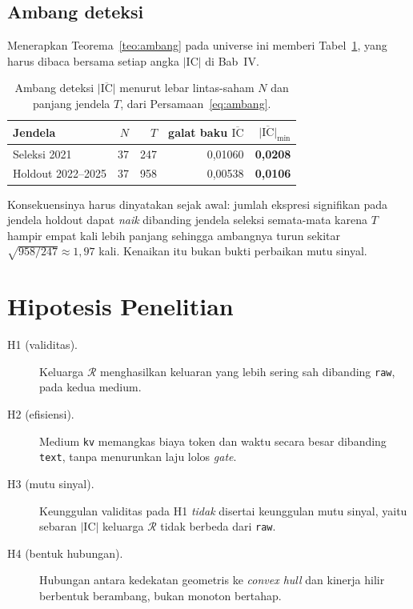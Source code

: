 \documentclass{laporanta1statugm}
\newcommand{\code}[1]{\texttt{#1}}
\begin{document}
\subsection{Ambang deteksi}

Menerapkan Teorema~\ref{teo:ambang} pada universe ini memberi
Tabel~\ref{tab:ambang}, yang harus dibaca bersama setiap angka
$\lvert\mathrm{IC}\rvert$ di Bab~IV.

\begin{table}[htbp]
\centering
\caption{Ambang deteksi $\lvert\overline{\mathrm{IC}}\rvert$ menurut lebar
lintas-saham $N$ dan panjang jendela $T$, dari Persamaan~\eqref{eq:ambang}.}
\label{tab:ambang}
\small
\begin{tabular}{lrrrr}
\hline
Jendela & $N$ & $T$ & galat baku $\overline{\mathrm{IC}}$ &
$\lvert\overline{\mathrm{IC}}\rvert_{\min}$ \\
\hline
Seleksi 2021 & 37 & 247 & 0,01060 & \textbf{0,0208} \\
Holdout 2022--2025 & 37 & 958 & 0,00538 & \textbf{0,0106} \\
\hline
\end{tabular}
\end{table}

Konsekuensinya harus dinyatakan sejak awal: jumlah ekspresi signifikan pada
jendela holdout dapat \emph{naik} dibanding jendela seleksi semata-mata karena
$T$ hampir empat kali lebih panjang sehingga ambangnya turun sekitar
$\sqrt{958/247}\approx 1{,}97$ kali. Kenaikan itu bukan bukti perbaikan mutu
sinyal.

\section{Hipotesis Penelitian}

\begin{description}
  \item[H1 (validitas).] Keluarga $\mathcal{R}$ menghasilkan keluaran yang
        lebih sering sah dibanding \code{raw}, pada kedua medium.
  \item[H2 (efisiensi).] Medium \code{kv} memangkas biaya token dan waktu
        secara besar dibanding \code{text}, tanpa menurunkan laju lolos
        \textit{gate}.
  \item[H3 (mutu sinyal).] Keunggulan validitas pada H1 \emph{tidak} disertai
        keunggulan mutu sinyal, yaitu sebaran $\lvert\mathrm{IC}\rvert$
        keluarga $\mathcal{R}$ tidak berbeda dari \code{raw}.
  \item[H4 (bentuk hubungan).] Hubungan antara kedekatan geometris ke
        \textit{convex hull} dan kinerja hilir berbentuk berambang, bukan
        monoton bertahap.
\end{description}
\end{document}
